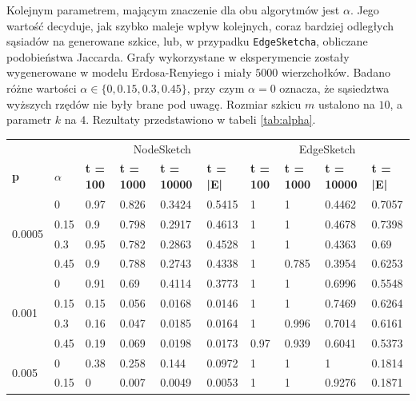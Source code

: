     Kolejnym parametrem, mającym znaczenie dla obu algorytmów jest $\alpha$. Jego wartość decyduje, jak szybko maleje wpływ kolejnych, coraz bardziej odległych sąsiadów na generowane szkice, lub, w przypadku \texttt{EdgeSketcha}, obliczane podobieństwa Jaccarda. Grafy wykorzystane w eksperymencie zostały wygenerowane w modelu Erdosa-Renyiego i miały $5000$ wierzchołków. Badano różne wartości $\alpha \in \{0, 0.15, 0.3, 0.45\}$, przy czym $\alpha = 0$ oznacza, że sąsiedztwa wyższych rzędów nie były brane pod uwagę. Rozmiar szkicu $m$ ustalono na $10$, a parametr $k$ na $4$. Rezultaty przedstawiono w tabeli \ref{tab:alpha}.

    \begin{table}[!ht]
        \small
        \centering
        \begin{tabular}{|l|l|l|l|l|l|l|l|l|l|}
        \hline
            & & \multicolumn{4}{c|}{NodeSketch} & \multicolumn{4}{c|}{EdgeSketch} \\ \cline{1-10}
            \textbf{p} & \textbf{$\alpha$} & \textbf{t = 100} & \textbf{t = 1000} & \textbf{t = 10000} & \textbf{t = |E|} & \textbf{t = 100} & \textbf{t = 1000} & \textbf{t = 10000} & \textbf{t = |E|} \\ \hline\hline
        \multirow{4}{*}{0.0005} & 0 & 0.97 & 0.826 & 0.3424 & 0.5415 & 1 & 1 & 0.4462 & 0.7057 \\ \cline{2-10}
            & 0.15 & 0.9 & 0.798 & 0.2917 & 0.4613 & 1 & 1 & 0.4678 & 0.7398 \\ \cline{2-10}
            & 0.3 & 0.95 & 0.782 & 0.2863 & 0.4528 & 1 & 1 & 0.4363 & 0.69 \\ \cline{2-10}
            & 0.45 & 0.9 & 0.788 & 0.2743 & 0.4338 & 1 & 0.785 & 0.3954 & 0.6253 \\ \hline\hline
        \multirow{4}{*}{0.001}    & 0 & 0.91 & 0.69 & 0.4114 & 0.3773 & 1 & 1 & 0.6996 & 0.5548 \\ \cline{2-10}
            & 0.15 & 0.15 & 0.056 & 0.0168 & 0.0146 & 1 & 1 & 0.7469 & 0.6264\\ \cline{2-10}
            & 0.3 & 0.16 & 0.047 & 0.0185 & 0.0164 & 1 & 0.996 & 0.7014 & 0.6161 \\ \cline{2-10}
            & 0.45 & 0.19 & 0.069 & 0.0198 & 0.0173 & 0.97 & 0.939 & 0.6041 & 0.5373 \\ \hline\hline
        \multirow{4}{*}{0.005}    & 0 & 0.38 & 0.258 & 0.144 & 0.0972 & 1 & 1 & 1 & 0.1814 \\ \cline{2-10}
            & 0.15 & 0 & 0.007 & 0.0049 & 0.0053 & 1 & 1 & 0.9276 & 0.1871 \\ \cline{2-10}

\end{tabular}
\end{table}
